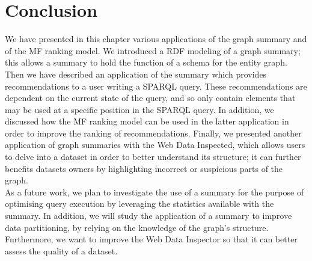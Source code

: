\section{Conclusion}

We have presented in this chapter various applications of the graph summary and of the MF ranking model. We introduced a RDF modeling of a graph summary; this allows a summary to hold the function of a schema for the entity graph. Then we have described an application of the summary which provides recommendations to a user writing a SPARQL query. These recommendations are dependent on the current state of the query, and so only contain elements that may be used at a specific position in the SPARQL query. In addition, we discussed how the MF ranking model can be used in the latter application in order to improve the ranking of recommendations. Finally, we presented another application of graph summaries with the Web Data Inspected, which allows users to delve into a dataset in order to better understand its structure; it can further benefits datasets owners by highlighting incorrect or suspicious parts of the graph.\\

As a future work, we plan to investigate the use of a summary for the purpose of optimising query execution by leveraging the statistics available with the summary. In addition, we will study the application of a summary to improve data partitioning, by relying on the knowledge of the graph's structure. Furthermore, we want to improve the Web Data Inspector so that it can better assess the quality of a dataset.
